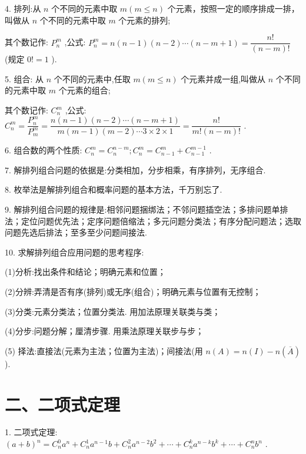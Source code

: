 4. 排列:从 $n$ 个不同的元素中取 $m\left( {m \leq  n}\right)$ 个元素，按照一定的顺序排成一排，叫做从 $n$ 个不同的元素中取 $m$ 个元素的排列;

其个数记作: ${{P}}_{n}^{m}$ ,公式: ${{P}}_{n}^{m} = n\left( {n - 1}\right) \left( {n - 2}\right) \cdots \left( {n - m + 1}\right)  = \dfrac{n!}{\left( {n - m}\right) !}$ (规定 $0! = 1$ ).

5. 组合: 从 $n$ 个不同的元素中,任取 $m\left( {m \leq  n}\right)$ 个元素并成一组,叫做从 $n$ 个不同的元素中取 $m$ 个元素的组合;

其个数记作: ${{C}}_{n}^{m}$ ,公式: ${{C}}_{n}^{m} = \dfrac{{{P}}_{n}^{m}}{{{P}}_{m}^{m}} = \dfrac{n\left( {n - 1}\right) \left( {n - 2}\right) \cdots \left( {n - m + 1}\right) }{m\left( {m - 1}\right) \left( {m - 2}\right) \cdots 3 \times  2 \times  1} = \dfrac{n!}{m!\left( {n - m}\right) !}$ .

6. 组合数的两个性质: ${{C}}_{n}^{m} = {{C}}_{n}^{n - m};{{C}}_{n}^{m} = {{C}}_{n - 1}^{m} + {{C}}_{n - 1}^{m - 1}$ .

7. 解排列组合问题的依据是:分类相加，分步相乘，有序排列，无序组合.

8. 枚举法是解排列组合和概率问题的基本方法，千万别忘了.

9. 解排列组合问题的规律是:相邻问题捆绑法；不邻问题插空法；多排问题单排法；定位问题优先法；定序问题倍缩法；多元问题分类法；有序分配问题法；选取问题先选后排法；至多至少问题间接法.

10. 求解排列组合应用问题的思考程序:

(1)分析:找出条件和结论；明确元素和位置；

(2)分辨:弄清是否有序(排列)或无序(组合)；明确元素与位置有无控制；

(3)分类:元素分类法；位置分类法. 用加法原理关联类与类；

(4)分步:问题分解；厘清步骤. 用乘法原理关联步与步；

(5) 择法:直接法(元素为主法；位置为主法)；间接法(用 $n\left( A\right)  = n\left( I\right)  - n\left( \overline{A}\right)$ ).

\section*{二、二项式定理}

1. 二项式定理: ${\left( a + b\right) }^{n} = {{C}}_{n}^{0}{a}^{n} + {{C}}_{n}^{1}{a}^{n - 1}b + {{C}}_{n}^{2}{a}^{n - 2}{b}^{2} + \cdots  + {{C}}_{n}^{k}{a}^{n - k}{b}^{k} + \cdots  + {{C}}_{n}^{n}{b}^{n}$ .



